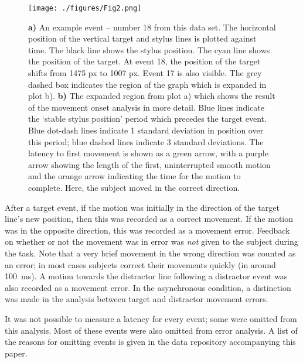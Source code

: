 \documentclass[10pt,letterpaper]{article}
\begin{document}
\begin{figure}[htb!]
\centering
\texttt{[image: ./figures/Fig2.png]}
\caption[Obtaining the latency, method 1] {\textbf{a)} An example
  event -- number 18 from this data set. The horizontal position of
  the vertical target and stylus lines is plotted against time. The
  black line shows the stylus position. The cyan line shows the
  position of the target. At event 18, the position of the target
  shifts from 1475 px to 1007 px. Event 17 is also visible. The grey
  dashed box indicates the region of the graph which is expanded in
  plot b). \textbf{b)} The expanded region from plot a) which shows
  the result of the movement onset analysis in more detail. Blue lines
  indicate the `stable stylus position' period which precedes the
  target event. Blue dot-dash lines indicate 1 standard deviation in
  position over this period; blue dashed lines indicate 3 standard
  deviations. The latency to first movement is shown as a green arrow,
  with a purple arrow showing the length of the first, uninterrupted
  smooth motion and the orange arrow indicating the time for the
  motion to complete. Here, the subject moved in the correct
  direction.}
\label{example_event}
\end{figure}

After a target event, if the motion was initially in the direction of
the target line's new position, then this was recorded as a correct
movement. If the motion was in the opposite direction, this was
recorded as a movement error. Feedback on whether or not the movement
was in error was \emph{not} given to the subject during the task. Note
that a very brief movement in the wrong direction was counted as an
error; in most cases subjects correct their movements quickly (in
around 100~ms). A motion towards the distractor line following a
distractor event was also recorded as a movement error. In the
asynchronous condition, a distinction was made in the analysis between
target and distractor movement errors.

It was not possible to measure a latency for every event; some were
omitted from this analysis. Most of these events were also omitted
from error analysis.
A list of the reasons for omitting events is given in the data
repository accompanying this paper.
\end{document}
